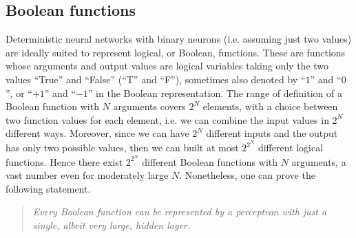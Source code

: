 \subsection{Boolean functions}
Deterministic neural networks with binary neurons (i.e. assuming just two values) are ideally suited to represent logical, or Boolean, functions. These are functions whose arguments and output values are logical variables taking only the two values ``True'' and ``False'' (``T'' and ``F''), sometimes also denoted by ``$1$'' and ``$0$'', or ``$+1$'' and ``$-1$'' in the Boolean representation. The range of definition of a Boolean function with $N$ arguments covers $2^N$ elements, with a choice between two function values for each element, i.e. we can combine the input values in $2^N$ different ways. Moreover, since we can have $2^N$ different inputs and the output has only two possible values, then we can built at most $2^{2^N}$ different logical functions. Hence there exist $2^{2^N}$ different Boolean functions with $N$ arguments, a vast number even for moderately large $N$. Nonetheless, one can prove the following statement.
\begin{quote}
\emph{Every Boolean function can be represented by a perceptron with just a single, albeit very large, hidden layer.}
\end{quote}
